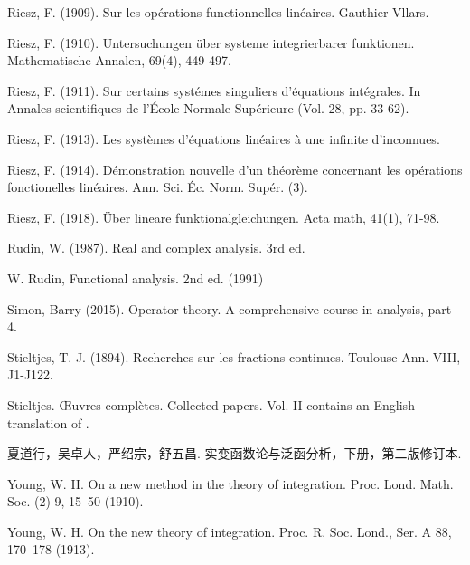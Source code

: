 \documentclass[12pt,b5paper,notitlepage]{article}
\theoremstyle{definition}
\theoremstyle{plain}
\numberwithin{equation}{section}
\begin{document}
\begin{thebibliography}{999999}
Riesz, F. (1909). Sur les op\'erations functionnelles lin\'eaires. Gauthier-Vllars.

Riesz, F. (1910). Untersuchungen \"uber systeme integrierbarer funktionen. Mathematische Annalen, 69(4), 449-497.


Riesz, F. (1911). Sur certains syst\'emes singuliers d'\'equations int\'egrales. In Annales scientifiques de l'\'Ecole Normale Sup\'erieure (Vol. 28, pp. 33-62).

Riesz, F. (1913). Les syst\`emes d'\'equations lin\'eaires \`a une infinite d'inconnues.


Riesz, F. (1914). D{\'e}monstration nouvelle d'un th{\'e}or{\`e}me concernant les op{\'e}rations fonctionelles lin{\'e}aires. Ann. Sci. {\'E}c. Norm. Sup{\'e}r. (3).

Riesz, F. (1918). \"Uber lineare funktionalgleichungen. Acta math, 41(1), 71-98.

Rudin, W. (1987). Real and complex analysis. 3rd ed.

W. Rudin, Functional analysis. 2nd ed. (1991)

Simon, Barry (2015). Operator theory. A comprehensive course in analysis, part 4.


Stieltjes, T. J. (1894). Recherches sur les fractions continues. Toulouse Ann. VIII, J1-J122.

Stieltjes. {\OE}uvres compl{\`e}tes. {Collected} papers. Vol. II contains an English translation of \cite{Sti94}.


\begin{CJK*}{UTF8}{gkai}
夏道行，吴卓人，严绍宗，舒五昌. 实变函数论与泛函分析，下册，第二版修订本.
\end{CJK*}


Young, W. H. On a new method in the theory of integration. Proc. Lond. Math. Soc. (2) 9, 15--50 (1910).

Young, W. H. On the new theory of integration.  Proc. R. Soc. Lond., Ser. A 88, 170--178 (1913).


		
\end{thebibliography}


\end{document}
